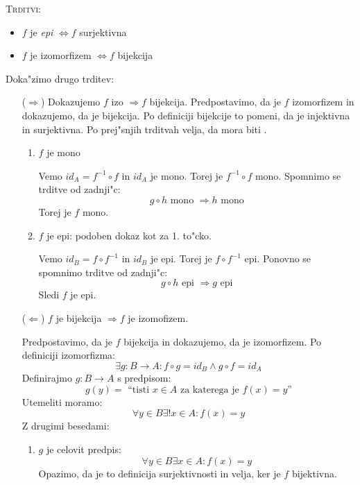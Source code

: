 \textsc{Trditvi:}
\begin{itemize}
	\item $f$ je \emph{epi} $\iff f$ surjektivna
	\item $f$ je izomorfizem $\iff f$ bijekcija
\end{itemize}
Doka"zimo drugo trditev:
\begin{itemize}
	\item[($\Rightarrow$)] Dokazujemo $f$ izo $\Rightarrow f$ bijekcija. Predpostavimo, da je $f$ izomorfizem in dokazujemo, da je bijekcija. Po definiciji bijekcije to pomeni, da je injektivna in surjektivna. Po prej"snjih trditvah velja, da mora biti .
	\begin{enumerate}
		\item $f$ je mono
		
		Vemo $id_A = f^{-1} \circ f$ in $id_A$ je mono. Torej je $f^{-1} \circ f$ mono. Spomnimo se trditve od zadnji"c:
		\begin{equation*}
		g \circ h \text{ mono } \Rightarrow h \text{ mono}
		\end{equation*}
		Torej je $f$ mono.
		
		\item $f$ je epi: podoben dokaz kot za 1. to"cko.
		
		Vemo $id_B = f \circ f^{-1}$ in $id_B$ je epi. Torej je $f \circ f^{-1}$ epi. Ponovno se spomnimo trditve od zadnji"c:
		\begin{equation*}
		g \circ h \text{ epi } \Rightarrow g \text{ epi}
		\end{equation*}
		Sledi $f$ je epi.
	\end{enumerate}

	\item[($\Leftarrow$)] $f$ je bijekcija $\Rightarrow f$ je izomofizem.
	
	Predpostavimo, da je $f$ bijekcija in dokazujemo, da je izomorfizem. Po definiciji izomorfizma:
	\begin{equation*}
	\exists g : B \to A: f\circ g = id_B \land g \circ f = id_A
	\end{equation*}
	Definirajmo $g: B \to A$ s predpisom:
	\begin{equation*}
	g(y) = \text{ ``tisti $x \in A$ za katerega je $f(x) = y$''}
	\end{equation*}
	Utemeliti moramo:
	\begin{equation*}
	\forall y \in B \exists!x \in A: f(x) = y
	\end{equation*}
	Z drugimi besedami:
	\begin{enumerate}
		\item $g$ je celovit predpis:
		\begin{equation*}
		\forall y \in B \exists x \in A: f(x) = y
		\end{equation*}
		Opazimo, da je to definicija surjektivnosti in velja, ker je $f$ bijektivna.
		

\end{enumerate}
\end{itemize}
